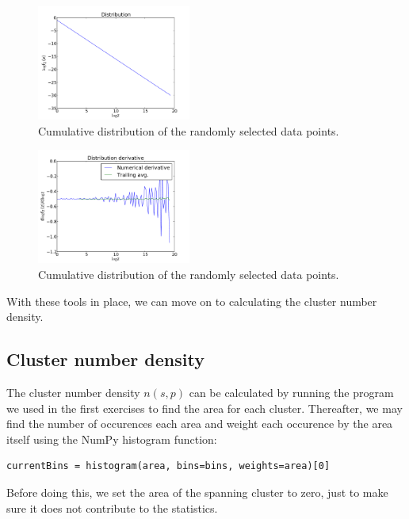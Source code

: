 \documentclass[a4paper,reprint,floatfix,amsmath,amssymb,aps,pra]{revtex4-1}
\begin{document}
\begin{figure}
  \centering
  \includegraphics[width=0.45\textwidth]{../percolation/results/1c/distribution.pdf}
  \caption{Cumulative distribution of the randomly selected data points.}
  \label{fig:powerlaw-distribution}
\end{figure}
\begin{figure}
  \centering
  \includegraphics[width=0.45\textwidth]{../percolation/results/1c/distribution-derivative.pdf}
  \caption{Cumulative distribution of the randomly selected data points.}
  \label{fig:powerlaw-distribution-derivative}
\end{figure}

With these tools in place, we can move on to calculating the cluster number density.

\subsection{Cluster number density}

The cluster number density $n(s,p)$ can be calculated by running the program we used in the first exercises to find the area for each cluster. Thereafter, we may find the number of occurences each area and weight each occurence by the area itself using the NumPy histogram function:
\begin{lstlisting}
currentBins = histogram(area, bins=bins, weights=area)[0]
\end{lstlisting}
Before doing this, we set the area of the spanning cluster to zero, just to make sure it does not contribute to the statistics.
\end{document}
